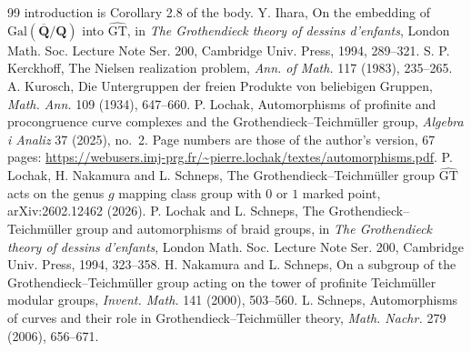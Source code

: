 \documentclass[11pt,a4paper]{article}
\theoremstyle{plain}
\theoremstyle{definition}
\theoremstyle{remark}
\newcommand{\GT}{\widehat{\mathrm{GT}}}
\begin{document}
\begin{thebibliography}{99}
introduction is Corollary 2.8 of the body.
 Y. Ihara, On the embedding of $\mathrm{Gal}(\overline{\mathbf Q}/\mathbf Q)$ into $\GT$, in \emph{The
Grothendieck theory of dessins d'enfants}, London Math. Soc. Lecture Note Ser. 200, Cambridge Univ. Press, 1994,
289--321.
 S. P. Kerckhoff, The Nielsen realization problem, \emph{Ann. of Math.} 117 (1983), 235--265.
 A. Kurosch, Die Untergruppen der freien Produkte von beliebigen Gruppen, \emph{Math. Ann.} 109
(1934), 647--660.
 P. Lochak, Automorphisms of profinite and procongruence curve complexes and the
Grothendieck--Teichm\"uller group, \emph{Algebra i Analiz} 37 (2025), no.~2. Page numbers are those of the author's
version, 67 pages: \url{https://webusers.imj-prg.fr/~pierre.lochak/textes/automorphisms.pdf}.
 P. Lochak, H. Nakamura and L. Schneps, The Grothendieck--Teichm\"uller group $\GT$ acts on the genus
$g$ mapping class group with $0$ or $1$ marked point, arXiv:2602.12462 (2026).
 P. Lochak and L. Schneps, The Grothendieck--Teichm\"uller group and automorphisms of braid groups, in
\emph{The Grothendieck theory of dessins d'enfants}, London Math. Soc. Lecture Note Ser. 200, Cambridge Univ.
Press, 1994, 323--358.
 H. Nakamura and L. Schneps, On a subgroup of the Grothendieck--Teichm\"uller group acting on the
tower of profinite Teichm\"uller modular groups, \emph{Invent. Math.} 141 (2000), 503--560.
 L. Schneps, Automorphisms of curves and their role in Grothendieck--Teichm\"uller theory, \emph{Math.
Nachr.} 279 (2006), 656--671.
\end{thebibliography}
\end{document}
